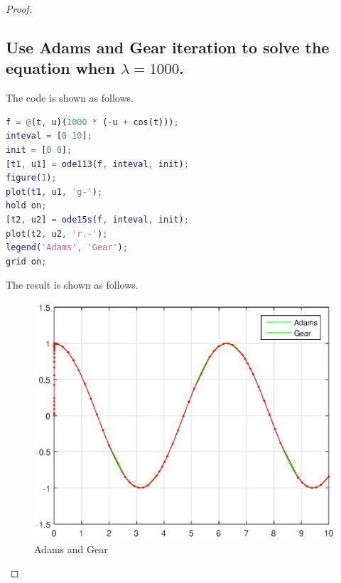 \documentclass{article}
\begin{document}
\begin{proof}
\subsection{Use Adams and Gear iteration to solve the equation when $\lambda=1000$.}
The code is shown as follows.
\begin{lstlisting}[language={MATLAB}]
f = @(t, u)(1000 * (-u + cos(t)));
inteval = [0 10];
init = [0 0];
[t1, u1] = ode113(f, inteval, init);
figure(1);
plot(t1, u1, 'g-');
hold on;
[t2, u2] = ode15s(f, inteval, init);
plot(t2, u2, 'r.-');
legend('Adams', 'Gear');
grid on;
\end{lstlisting}
The result is shown as follows.
\begin{figure}[htbp]
\centering
\includegraphics[width = 15cm]{3.eps}
\caption{Adams and Gear}
\label{Lambda}
\end{figure}
\end{proof}
\end{document}
